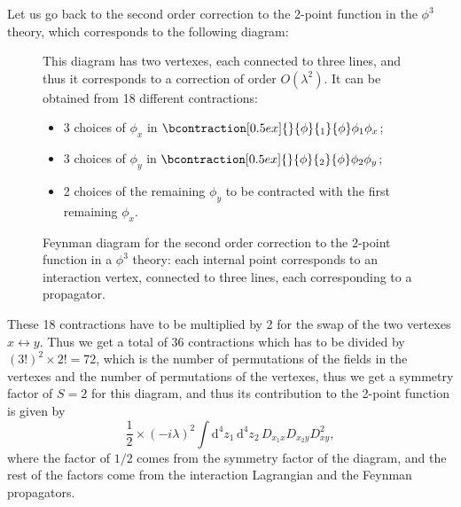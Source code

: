 \begin{example}
    Let us go back to the second order correction to the 2-point function in the \(\phi^3\) theory, which corresponds to the following diagram:
    \begin{figure}[H]
        \begin{minipage}{0.45\textwidth}
            \centering
            \caption{Feynman diagram for the second order correction to the 2-point function in a \(\phi^3\) theory: each internal point corresponds to an interaction vertex, connected to three lines, each corresponding to a propagator.}
        \end{minipage}
        \hfill
        \begin{minipage}{0.5\textwidth}
            This diagram has two vertexes, each connected to three lines, and thus it corresponds to a correction of order \(O(\lambda^2)\). It can be obtained from 18 different contractions:
            \begin{itemize}
                \item 3 choices of \(\phi_x\) in \(\bcontraction[0.5ex]{}{\phi}{_1}{\phi} \phi_1 \phi_x\);
                \item 3 choices of \(\phi_y\) in \(\bcontraction[0.5ex]{}{\phi}{_2}{\phi} \phi_2 \phi_y\);
                \item 2 choices of the remaining \(\phi_y\) to be contracted with the first remaining \(\phi_x\).
            \end{itemize}
        \end{minipage}
    \end{figure}
    These 18 contractions have to be multiplied by 2 for the swap of the two vertexes \(x \leftrightarrow y\). Thus we get a total of 36 contractions which has to be divided by \((3!)^2 \times 2! = 72\), which is the number of permutations of the fields in the vertexes and the number of permutations of the vertexes, thus we get a symmetry factor of \(S=2\) for this diagram, and thus its contribution to the 2-point function is given by
    \[
        \frac{1}{2} \times (-i \lambda)^2 \int \mathrm{d}^4 z_1 \, \mathrm{d}^4 z_2 \, D_{x_1 x} D_{x_2 y} D_{xy}^2,
    \]
    where the factor of \(1/2\) comes from the symmetry factor of the diagram, and the rest of the factors come from the interaction Lagrangian and the Feynman propagators.


\end{example}

